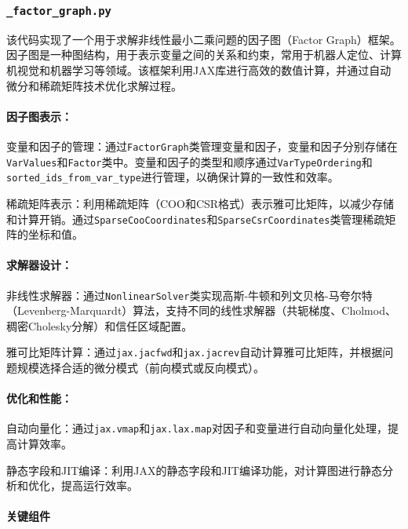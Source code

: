 \documentclass{ctexart}
\begin{document}
\subsubsection{\texttt{\_factor\_graph.py}}

该代码实现了一个用于求解非线性最小二乘问题的因子图（Factor Graph）框架。因子图是一种图结构，用于表示变量之间的关系和约束，常用于机器人定位、计算机视觉和机器学习等领域。该框架利用JAX库进行高效的数值计算，并通过自动微分和稀疏矩阵技术优化求解过程。

\paragraph{因子图表示：}

变量和因子的管理：通过\texttt{FactorGraph}类管理变量和因子，变量和因子分别存储在\texttt{VarValues}和\texttt{Factor}类中。变量和因子的类型和顺序通过\texttt{VarTypeOrdering}和\texttt{sorted\_ids\_from\_var\_type}进行管理，以确保计算的一致性和效率。

稀疏矩阵表示：利用稀疏矩阵（COO和CSR格式）表示雅可比矩阵，以减少存储和计算开销。通过\texttt{SparseCooCoordinates}和\texttt{SparseCsrCoordinates}类管理稀疏矩阵的坐标和值。

\paragraph{求解器设计：}

非线性求解器：通过\texttt{NonlinearSolver}类实现高斯-牛顿和列文贝格-马夸尔特（Levenberg-Marquardt）算法，支持不同的线性求解器（共轭梯度、Cholmod、稠密Cholesky分解）和信任区域配置。

雅可比矩阵计算：通过\texttt{jax.jacfwd}和\texttt{jax.jacrev}自动计算雅可比矩阵，并根据问题规模选择合适的微分模式（前向模式或反向模式）。

\paragraph{优化和性能：}

自动向量化：通过\texttt{jax.vmap}和\texttt{jax.lax.map}对因子和变量进行自动向量化处理，提高计算效率。

静态字段和JIT编译：利用JAX的静态字段和JIT编译功能，对计算图进行静态分析和优化，提高运行效率。

\paragraph{关键组件}
\end{document}
